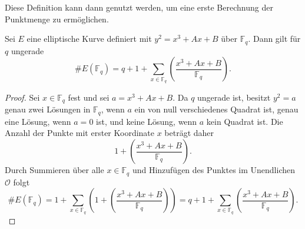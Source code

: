Diese Definition kann dann genutzt werden, um eine erste Berechnung der Punktmenge zu ermöglichen.
\begin{theorem}
    Sei $E$ eine elliptische Kurve definiert mit \(y^2=x^3+Ax+B\) über $\mathbb{F}_q$. Dann gilt für $q$ ungerade
    \[
        \#E(\mathbb{F}_q)=q+1+\sum_{x\in\mathbb{F}_q}\left(\frac{x^3+Ax+B}{\mathbb{F}_q}\right).
    \]
\end{theorem}
\begin{proof}
    Sei $x\in\mathbb F_q$ fest und sei $a=x^3+Ax+B$. Da $q$ ungerade ist, besitzt $y^2=a$ genau zwei Lösungen in $\mathbb F_q$, wenn $a$ ein von null verschiedenes
    Quadrat ist, genau eine Lösung, wenn $a=0$ ist, und keine Lösung, wenn $a$ kein Quadrat ist. Die Anzahl der Punkte mit erster Koordinate $x$ beträgt daher
    \[
        1+\left(\frac{x^3+Ax+B}{\mathbb F_q}\right).
    \]
    Durch Summieren über alle $x\in\mathbb F_q$ und Hinzufügen des Punktes im Unendlichen $\mathcal O$ folgt
    \[
        \#E(\mathbb F_q)
        =1+\sum_{x\in\mathbb F_q}
        \left(1+\left(\frac{x^3+Ax+B}{\mathbb F_q}\right)\right)
        =q+1+\sum_{x\in\mathbb F_q}
        \left(\frac{x^3+Ax+B}{\mathbb F_q}\right).
    \]
\end{proof}
